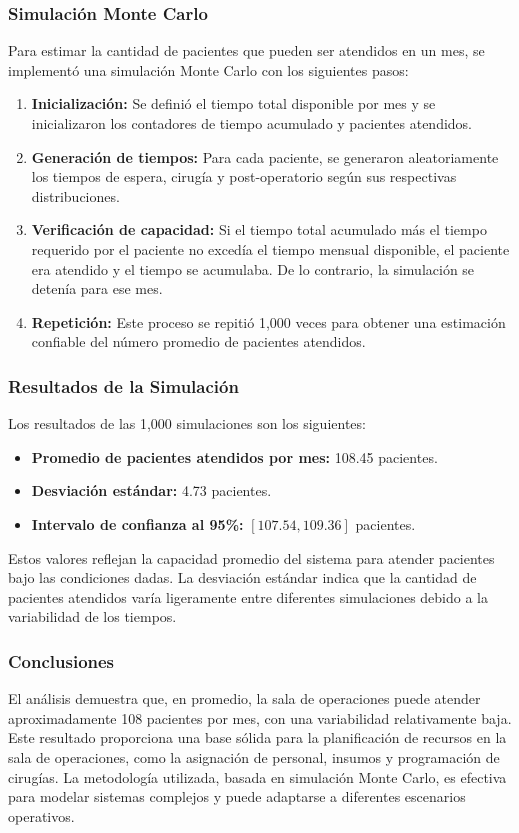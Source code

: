 \documentclass[12pt]{article}
\begin{document}
\subsubsection{Simulación Monte Carlo}
Para estimar la cantidad de pacientes que pueden ser atendidos en un mes, se implementó una simulación Monte Carlo con los siguientes pasos:
\begin{enumerate}
    \item \textbf{Inicialización:} Se definió el tiempo total disponible por mes y se inicializaron los contadores de tiempo acumulado y pacientes atendidos.
    \item \textbf{Generación de tiempos:} Para cada paciente, se generaron aleatoriamente los tiempos de espera, cirugía y post-operatorio según sus respectivas distribuciones.
    \item \textbf{Verificación de capacidad:} Si el tiempo total acumulado más el tiempo requerido por el paciente no excedía el tiempo mensual disponible, el paciente era atendido y el tiempo se acumulaba. De lo contrario, la simulación se detenía para ese mes.
    \item \textbf{Repetición:} Este proceso se repitió 1,000 veces para obtener una estimación confiable del número promedio de pacientes atendidos.
\end{enumerate}

\subsubsection{Resultados de la Simulación}
Los resultados de las 1,000 simulaciones son los siguientes:
\begin{itemize}
    \item \textbf{Promedio de pacientes atendidos por mes:} 108.45 pacientes.
    \item \textbf{Desviación estándar:} 4.73 pacientes.
    \item \textbf{Intervalo de confianza al 95\%:} $[107.54, 109.36]$ pacientes.
\end{itemize}

Estos valores reflejan la capacidad promedio del sistema para atender pacientes bajo las condiciones dadas. La desviación estándar indica que la cantidad de pacientes atendidos varía ligeramente entre diferentes simulaciones debido a la variabilidad de los tiempos.

\subsubsection*{Conclusiones}
El análisis demuestra que, en promedio, la sala de operaciones puede atender aproximadamente 108 pacientes por mes, con una variabilidad relativamente baja. Este resultado proporciona una base sólida para la planificación de recursos en la sala de operaciones, como la asignación de personal, insumos y programación de cirugías. La metodología utilizada, basada en simulación Monte Carlo, es efectiva para modelar sistemas complejos y puede adaptarse a diferentes escenarios operativos.
\end{document}
